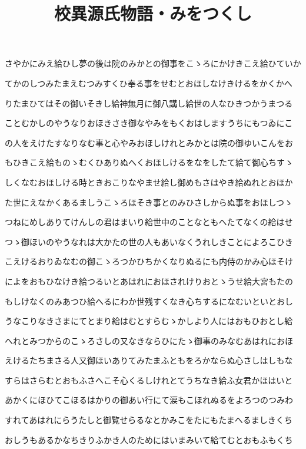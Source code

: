 \documentclass[a4paper,11pt,landscape]{ltjtarticle}
\title{校異源氏物語・みをつくし}
\date{}
\begin{document}
\maketitle

さやかにみえ給ひし夢の後は院のみかとの御事をこゝろにかけきこえ給ひていか
\par\medskip
てかのしつみたまえむつみすくひ奉る事をせむとおほしなけきけるをかくかへ
\par\medskip
りたまひてはその御いそきし給神無月に御八講し給世の人なひきつかうまつる
\par\medskip
ことむかしのやうなりおほきさき御なやみをもくおはしますうちにもつゐにこ
\par\medskip
の人をえけたすなりなむ事と心やみおほしけれとみかとは院の御ゆいこんをお
\par\medskip
もひきこえ給ものゝむくひありぬへくおほしけるをなをしたて給て御心ちすゝ
\par\medskip
しくなむおほしける時ときおこりなやませ給し御めもさはやき給ぬれとおほか
\par\medskip
た世にえなかくあるましうこゝろほそき事とのみひさしからぬ事をおほしつゝ
\par\medskip
つねにめしありてけんしの君はまいり給世中のことなともへたてなくの給はせ
\par\medskip
つゝ御ほいのやうなれは大かたの世の人もあいなくうれしきことによろこひき
\par\medskip
こえけるおりゐなむの御こゝろつかひちかくなりぬるにも内侍のかみ心ほそけ
\par\medskip
によをおもひなけき給つるいとあはれにおほされけりおとゝうせ給大宮もたの
\par\medskip
もしけなくのみあつひ給へるにわか世残すくなき心ちするになむいといとおし
\par\medskip
うなこりなきさまにてとまり給はむとすらむゝかしより人にはおもひおとし給
\par\medskip
へれとみつからのこゝろさしの又なきならひにたゝ御事のみなむあはれにおほ
\par\medskip
えけるたちまさる人又御ほいありてみたまふともをろかならぬ心さしはしもな
\par\medskip
すらはさらむとおもふさへこそ心くるしけれとてうちなき給ふ女君かほはいと
\par\medskip
あかくにほひてこほるはかりの御あい行にて涙もこほれぬるをよろつのつみわ
\par\medskip
すれてあはれにらうたしと御覧せらるなとかみこをたにもたまへるましきくち
\par\medskip
おしうもあるかなちきりふかき人のためにはいまみいて給てむとおもふもくち
\end{document}
